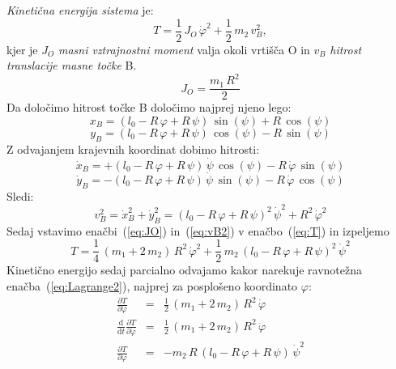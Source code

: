 \emph{Kinetična energija sistema} je:
\begin{equation}\label{eq:T}
  T=
  \frac{1}{2}\,J_O\,\dot{\varphi}^2+
  \frac{1}{2}\,m_2\,v_B^2,
\end{equation}
kjer je $J_O$ \emph{masni vztrajnostni moment} valja okoli vrtišča
O in $v_B$ \emph{hitrost translacije masne točke} B.
\begin{equation}\label{eq:JO}
  J_O=
  \frac{m_1\,R^2}{2}
\end{equation}
Da določimo hitrost točke B določimo najprej njeno lego:
\begin{equation}\label{eq:xB}
  x_B=
  (l_0-R\,\varphi+R\,\psi)\,
  \sin(\psi)+
  R\,\cos(\psi)
\end{equation}
\begin{equation}\label{eq:yB}
  y_B=
  (l_0-R\,\varphi+R\,\psi)\,
  \cos(\psi)-
  R\,\sin(\psi)
\end{equation}
Z odvajanjem krajevnih koordinat dobimo hitrosti:
\begin{equation}\label{eq:dxB}
  \dot{x}_B=
  +(l_0-R\,\varphi+R\,\psi)\,
  \dot{\psi}\,\cos(\psi)-
  R\,\dot{\varphi}\,\sin(\psi)
\end{equation}
\begin{equation}\label{eq:dyB}
  \dot{y}_B=
  -(l_0-R\,\varphi+R\,\psi)\,
  \dot{\psi}\,\sin(\psi)-
  R\,\dot{\varphi}\,\cos(\psi)
\end{equation}
Sledi:
\begin{equation}\label{eq:vB2}
  v_B^2=\dot{x}_B^2+\dot{y}_B^2=
  (l_0-R\,\varphi+R\,\psi)^2\,
  \dot{\psi}^2
  +R^2\,\dot{\varphi}^2
\end{equation}
Sedaj vstavimo enačbi~(\ref{eq:JO}) in~(\ref{eq:vB2}) v
enačbo~(\ref{eq:T}) in izpeljemo
\begin{equation}\label{eq:Tizpelj}
  T=
  \frac{1}{4}\,
  (m_1+2\,m_2)\,
  R^2\,\dot{\varphi}^2+
  \frac{1}{2}\,m_2\,
  (l_0-R\,\varphi+R\,\psi)^2\,\dot{\psi}^2
\end{equation}
Kinetično energijo sedaj parcialno odvajamo kakor narekuje
ravnotežna enačba~(\ref{eq:Lagrange2}), najprej za posplošeno
koordinato $\varphi$:
\begin{eqnarray}\label{eq:dPosp1}
  \frac{\partial T}{\partial \dot{\varphi}}&=&
  \frac{1}{2}\,(m_1+2\,m_2)\,R^2\,\dot{\varphi}\\
%
  \frac{\textrm{d}}{\textrm{d}t}
  \frac{\partial T}{\partial \dot{\varphi}}&=&
  \frac{1}{2}\,(m_1+2\,m_2)\,R^2\,\ddot{\varphi}\\
%
  \frac{\partial T}{\partial \varphi}&=&
  -m_2\,R\,(l_0-R\,\varphi+R\,\psi)\,\dot{\psi}^2\\
\end{eqnarray}
